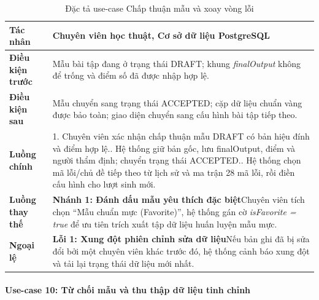\begingroup
\small
\begin{longtable}{|p{3.2cm}|p{\dimexpr\linewidth-3.2cm-4\tabcolsep-3\arrayrulewidth\relax}|}
\caption{Đặc tả use-case Chấp thuận mẫu và xoay vòng lỗi}
\label{aihub:tab:uc_academic_accept}\\
\hline
\textbf{Tác nhân} & Chuyên viên học thuật, Cơ sở dữ liệu PostgreSQL \\ \hline
\textbf{Điều kiện trước} & Mẫu bài tập đang ở trạng thái DRAFT; khung \textit{finalOutput} không để trống và điểm số đã được nhập hợp lệ. \\ \hline
\textbf{Điều kiện sau} & Mẫu chuyển sang trạng thái ACCEPTED; cặp dữ liệu chuẩn vàng được bảo toàn; giao diện chuyển sang cấu hình bài tập tiếp theo. \\ \hline
\textbf{Luồng chính} & 1. Chuyên viên xác nhận chấp thuận mẫu DRAFT có bản hiệu đính và điểm hợp lệ.\newline 2. Hệ thống giữ bản gốc, lưu finalOutput, điểm và người thẩm định; chuyển trạng thái ACCEPTED.\newline 3. Hệ thống chọn mã lỗi/chủ đề tiếp theo từ lịch sử và ma trận 28 mã lỗi, rồi điền cấu hình cho lượt sinh mới. \\ \hline
\textbf{Luồng thay thế} &
\textbf{Nhánh 1: Đánh dấu mẫu yêu thích đặc biệt}\newline Chuyên viên tích chọn ``Mẫu chuẩn mực (Favorite)'', hệ thống gán cờ \textit{isFavorite = true} để ưu tiên trích xuất tập dữ liệu huấn luyện mẫu mực. \\ \hline
\textbf{Ngoại lệ} &
\textbf{Lỗi 1: Xung đột phiên chỉnh sửa dữ liệu}\newline Nếu bản ghi đã bị sửa đổi bởi một chuyên viên khác trước đó, hệ thống cảnh báo xung đột và tải lại trạng thái dữ liệu mới nhất. \\ \hline
\end{longtable}
\endgroup

\paragraph{Use-case 10: Từ chối mẫu và thu thập dữ liệu tinh chỉnh}

